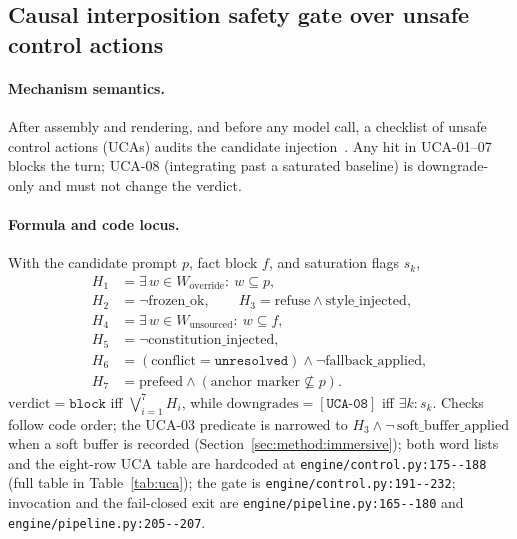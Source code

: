 \subsection{Causal interposition safety gate over unsafe control actions}\label{sec:method:gate}

\paragraph{Mechanism semantics.} After assembly and rendering, and before any
model call, a checklist of unsafe control actions (UCAs) audits the candidate
injection~\cite{leveson2018}. Any hit in UCA-01--07 blocks the turn; UCA-08
(integrating past a saturated baseline) is downgrade-only and must not change
the verdict.

\paragraph{Formula and code locus.} With the candidate prompt $p$, fact block
$f$, and saturation flags $s_k$,
{\small
\begin{equation}
\begin{aligned}
H_1 &= \exists\, w \in W_{\mathrm{override}}:\ w \subseteq p,\\
H_2 &= \neg \mathrm{frozen\_ok},\qquad
H_3 = \mathrm{refuse} \land \mathrm{style\_injected},\\
H_4 &= \exists\, w \in W_{\mathrm{unsourced}}:\ w \subseteq f,\\
H_5 &= \neg \mathrm{constitution\_injected},\\
H_6 &= (\mathrm{conflict} = \texttt{unresolved}) \land \neg \mathrm{fallback\_applied},\\
H_7 &= \mathrm{prefeed} \land (\text{anchor marker} \not\subseteq p).
\end{aligned}
\end{equation}
}
$\mathrm{verdict} = \texttt{block}$ iff $\bigvee_{i=1}^{7} H_i$, while
$\mathrm{downgrades} = [\texttt{UCA-08}]$ iff $\exists k: s_k$. Checks follow
code order; the UCA-03 predicate is narrowed to
$H_3 \land \neg\,\mathrm{soft\_buffer\_applied}$ when a soft buffer is recorded
(Section~\ref{sec:method:immersive}); both word lists and the eight-row UCA table
are hardcoded at
\texttt{engine/\allowbreak{}control.\allowbreak{}py:\allowbreak{}175-\allowbreak{}-\allowbreak{}188} (full table in
Table~\ref{tab:uca}); the gate is
\texttt{engine/\allowbreak{}control.\allowbreak{}py:\allowbreak{}191-\allowbreak{}-\allowbreak{}232}; invocation and the fail-closed exit are
\texttt{engine/\allowbreak{}pipeline.\allowbreak{}py:\allowbreak{}165-\allowbreak{}-\allowbreak{}180} and \texttt{engine/\allowbreak{}pipeline.\allowbreak{}py:\allowbreak{}205-\allowbreak{}-\allowbreak{}207}.

